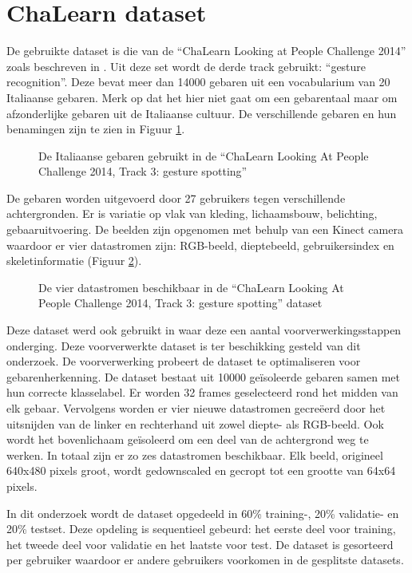 \section{ChaLearn dataset}
De gebruikte dataset is die van de ``ChaLearn Looking at People Challenge 2014'' zoals beschreven in \cite{escalera_chalearn_2014}. Uit deze set wordt de derde track gebruikt: ``gesture recognition''. Deze bevat meer dan 14000 gebaren uit een vocabularium van 20 Italiaanse gebaren. Merk op dat het hier niet gaat om een gebarentaal maar om afzonderlijke gebaren uit de Italiaanse cultuur. De verschillende gebaren en hun benamingen zijn te zien in Figuur \ref{fig:gebaren}.
\begin{figure}
	\centering
	\def\svgwidth{\columnwidth}
	
	\caption{De Italiaanse gebaren gebruikt in de ``ChaLearn Looking At People Challenge 2014, Track 3: gesture spotting''}
	\label{fig:gebaren}
\end{figure}
\npar De gebaren worden uitgevoerd door 27 gebruikers tegen verschillende achtergronden. Er is variatie op vlak van kleding, lichaamsbouw, belichting, gebaaruitvoering. De beelden zijn opgenomen met behulp van een Kinect camera waardoor er vier datastromen zijn: RGB-beeld, dieptebeeld, gebruikersindex en skeletinformatie (Figuur \ref{fig:chalearn-data}).
\begin{figure}
	\centering
	\def\svgwidth{\columnwidth}
	
	\caption{De vier datastromen beschikbaar in de ``ChaLearn Looking At People Challenge 2014, Track 3: gesture spotting'' dataset}
	\label{fig:chalearn-data}
\end{figure}
\npar Deze dataset werd ook gebruikt in \cite{lionel} waar deze een aantal voorverwerkingsstappen onderging. Deze voorverwerkte dataset is ter beschikking gesteld van dit onderzoek. De voorverwerking probeert de dataset te optimaliseren voor gebarenherkenning. De dataset bestaat uit 10000 ge\"isoleerde gebaren samen met hun correcte klasselabel. Er worden 32 frames geselecteerd rond het midden van elk gebaar. Vervolgens worden er vier nieuwe datastromen gecre\"eerd door het uitsnijden van de linker en rechterhand uit zowel diepte- als RGB-beeld. Ook wordt het bovenlichaam ge\"isoleerd om een deel van de achtergrond weg te werken. In totaal zijn er zo zes datastromen beschikbaar. Elk beeld, origineel 640x480 pixels groot, wordt gedownscaled en gecropt tot een grootte van 64x64 pixels. 

\npar In dit onderzoek wordt de dataset opgedeeld in 60\% training-, 20\% validatie- en 20\% testset. Deze opdeling is sequentieel gebeurd: het eerste deel voor training, het tweede deel voor validatie en het laatste voor test. De dataset is gesorteerd per gebruiker waardoor er andere gebruikers voorkomen in de gesplitste datasets.


